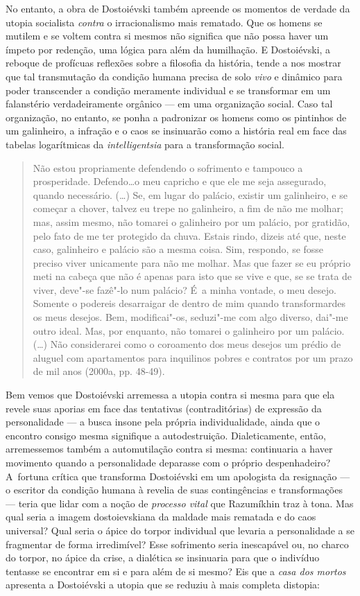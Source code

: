 No entanto, a obra de Dostoiévski também apreende os momentos de verdade
da utopia socialista \emph{contra} o irracionalismo mais rematado. Que
os homens se mutilem e se voltem contra si mesmos não significa que não
possa haver um ímpeto por redenção, uma lógica para além da humilhação.
E Dostoiévski, a reboque de profícuas reflexões sobre a filosofia da
história, tende a nos mostrar que tal transmutação da condição humana
precisa de solo \emph{vivo} e dinâmico para poder transcender a condição
meramente individual e se transformar em um falanstério verdadeiramente
orgânico --- em uma organização social. Caso tal organização, no entanto,
se ponha a padronizar os homens como os pintinhos de um galinheiro, a
infração e o caos se insinuarão como a história real em face das tabelas
logarítmicas da \emph{intelligentsia} para a transformação social.

\begin{quote}
Não estou propriamente defendendo o sofrimento e tampouco a
prosperidade. Defendo\ldots o meu capricho e que ele me seja assegurado,
quando necessário. (\ldots) Se, em lugar do palácio, existir um galinheiro,
e se começar a chover, talvez eu trepe no galinheiro, a fim de não me
molhar; mas, assim mesmo, não tomarei o galinheiro por um palácio, por
gratidão, pelo fato de me ter protegido da chuva. Estais rindo, dizeis
até que, neste caso, galinheiro e palácio são a mesma coisa. Sim,
respondo, se fosse preciso viver unicamente para não me molhar. Mas que
fazer se eu próprio meti na cabeça que não é apenas para isto que se
vive e que, se se trata de viver, deve"-se fazê"-lo num palácio? É~a minha
vontade, o meu desejo. Somente o podereis desarraigar de dentro de mim
quando transformardes os meus desejos. Bem, modificai"-os, seduzi"-me com
algo diverso, dai"-me outro ideal. Mas, por enquanto, não tomarei o
galinheiro por um palácio. (\ldots) Não considerarei como o coroamento dos
meus desejos um prédio de aluguel com apartamentos para inquilinos
pobres e contratos por um prazo de mil anos (2000a, pp. 48-49).
\end{quote}

Bem vemos que Dostoiévski arremessa a utopia contra si mesma para que
ela revele suas aporias em face das tentativas (contraditórias) de
expressão da personalidade --- a busca insone pela própria
individualidade, ainda que o encontro consigo mesma signifique a
autodestruição. Dialeticamente, então, arremessemos também a
automutilação contra si mesma: continuaria a haver movimento quando a
personalidade deparasse com o próprio despenhadeiro? A~fortuna crítica
que transforma Dostoiévski em um apologista da resignação --- o escritor
da condição humana à revelia de suas contingências e transformações ---
teria que lidar com a noção de \emph{processo vital} que Razumíkhin traz
à tona. Mas qual seria a imagem dostoievskiana da maldade mais rematada
e do caos universal? Qual seria o ápice do torpor individual que levaria
a personalidade a se fragmentar de forma irredimível? Esse sofrimento
seria inescapável ou, no charco do torpor, no ápice da crise, a
dialética se insinuaria para que o indivíduo tentasse se encontrar em si
e para além de si mesmo? Eis que a \emph{casa dos mortos} apresenta a
Dostoiévski a utopia que se reduziu à mais completa distopia:

